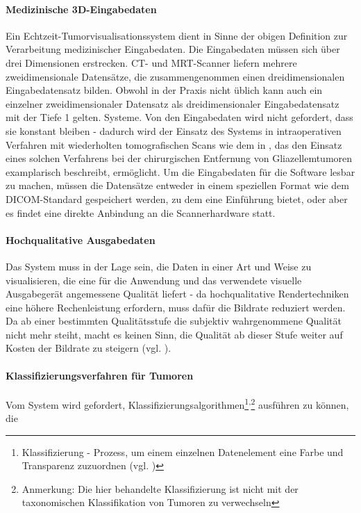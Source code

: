 \documentclass[a4paper,titlepage,12pt]{scrartcl}
\newtheorem[L]{boxedDefinition}{Definition}
\begin{document}
\paragraph{Medizinische 3D-Eingabedaten} Ein Echtzeit-Tumorvisualisationssystem dient in Sinne der obigen Definition zur Verarbeitung medizinischer Eingabedaten. Die Eingabedaten müssen sich über drei Dimensionen erstrecken. CT- und MRT-Scanner liefern mehrere zweidimensionale Datensätze, die zusammengenommen einen dreidimensionalen Eingabedatensatz bilden. Obwohl in der Praxis nicht üblich kann auch ein einzelner zweidimensionaler Datensatz als dreidimensionaler Eingabedatensatz mit der Tiefe 1 gelten. Systeme. Von den Eingabedaten wird nicht gefordert, dass sie konstant bleiben - dadurch wird der Einsatz des Systems in intraoperativen Verfahren mit wiederholten tomografischen Scans wie dem in \cite{Okudera1994}, das den Einsatz eines solchen Verfahrens bei der chirurgischen Entfernung von Gliazellemtumoren examplarisch beschreibt, ermöglicht. Um die Eingabedaten für die Software lesbar zu machen, müssen die Datensätze entweder in einem speziellen Format wie dem DICOM-Standard gespeichert werden, zu dem \cite{Mildenberger2002} eine Einführung bietet, oder aber es findet eine direkte Anbindung an die Scannerhardware statt.

\paragraph{Hochqualitative Ausgabedaten} Das System muss in der Lage sein, die Daten in einer Art und Weise zu visualisieren, die eine für die Anwendung und das verwendete visuelle Ausgabegerät angemessene Qualität liefert - da hochqualitative Rendertechniken eine höhere Rechenleistung erfordern, muss dafür die Bildrate reduziert werden. Da ab einer bestimmten Qualitätsstufe die subjektiv wahrgenommene Qualität nicht mehr steiht, macht es keinen Sinn, die Qualität ab dieser Stufe weiter auf Kosten der Bildrate zu steigern (vgl. \cite[Kapitel 3.3, Seite 5]{Kutter2008}).

\paragraph{Klassifizierungsverfahren für Tumoren} Vom System wird gefordert, Klassifizierungsalgorithmen\footnote{Klassifizierung - Prozess, um einem einzelnen Datenelement eine Farbe und Transparenz zuzuordnen (vgl. \cite[Kapitel 3.2.2, Seite 28]{Bruckner2004})}\textsuperscript{,}\footnote{Anmerkung: Die hier behandelte Klassifizierung ist nicht mit der taxonomischen Klassifikation von Tumoren zu verwechseln} ausführen zu können, die
\end{document}
